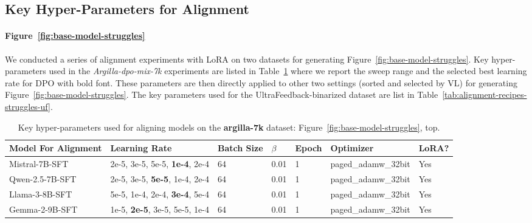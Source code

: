\subsection{Key Hyper-Parameters for Alignment}
\paragraph{Figure~\ref{fig:base-model-struggles}} We conducted a series of alignment experiments with LoRA on two datasets for generating Figure~\ref{fig:base-model-struggles}. Key hyper-parameters used in the 
\textit{Argilla-dpo-mix-7k} experiments are listed in Table~\ref{tab:alignment-recipes-struggles-argilla} where we report the sweep range and the selected best learning rate for DPO with bold font. These parameters are then directly applied to other two settings (sorted and selected by VL) for generating Figure~\ref{fig:base-model-struggles}. The key parameters used for the UltraFeedback-binarized  dataset are list in Table~\ref{tab:alignment-recipes-struggles-uf}.
\vspace{-0.2cm}
\begin{table}[h]
\centering
\caption{Key hyper-parameters used for aligning models on the \textbf{argilla-7k} dataset: Figure~\ref{fig:base-model-struggles}, top.}
\renewcommand{\arraystretch}{1.3} 
\begin{tabular}{l l l l l l l}
\toprule
\textbf{Model For Alignment} & \textbf{Learning Rate} & \textbf{Batch Size} & \textbf{$\beta$} & \textbf{Epoch} & \textbf{Optimizer} &\textbf{LoRA?}\\ 
\midrule
Mistral-7B-SFT & 2e-5, 3e-5, 5e-5, \textbf{1e-4}, 2e-4 & 64 & 0.01 & 1 & paged\_adamw\_32bit & Yes\\ 
Qwen-2.5-7B-SFT & 2e-5, 3e-5, \textbf{5e-5}, 1e-4, 2e-4 & 64 & 0.01 & 1 & paged\_adamw\_32bit & Yes\\ 
Llama-3-8B-SFT & 5e-5, 1e-4, 2e-4, \textbf{3e-4}, 5e-4 & 64 & 0.01 & 1 & paged\_adamw\_32bit & Yes\\ 
Gemma-2-9B-SFT & 1e-5, \textbf{2e-5}, 3e-5, 5e-5, 1e-4 & 64 & 0.01 & 1 & paged\_adamw\_32bit & Yes\\ 
\bottomrule
\end{tabular}
\label{tab:alignment-recipes-struggles-argilla}
\end{table}

